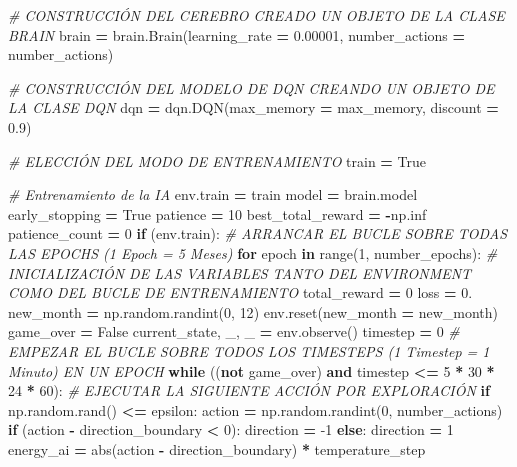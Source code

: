 \documentclass[]{book}
\newenvironment{Shaded}{\begin{snugshade}}{\end{snugshade}}
\newcommand{\BuiltInTok}[1]{#1}
\newcommand{\CommentTok}[1]{\textcolor[rgb]{0.56,0.35,0.01}{\textit{#1}}}
\newcommand{\ControlFlowTok}[1]{\textcolor[rgb]{0.13,0.29,0.53}{\textbf{#1}}}
\newcommand{\DecValTok}[1]{\textcolor[rgb]{0.00,0.00,0.81}{#1}}
\newcommand{\FloatTok}[1]{\textcolor[rgb]{0.00,0.00,0.81}{#1}}
\newcommand{\KeywordTok}[1]{\textcolor[rgb]{0.13,0.29,0.53}{\textbf{#1}}}
\newcommand{\NormalTok}[1]{#1}
\newcommand{\OperatorTok}[1]{\textcolor[rgb]{0.81,0.36,0.00}{\textbf{#1}}}
\newcommand{\VariableTok}[1]{\textcolor[rgb]{0.00,0.00,0.00}{#1}}
\begin{document}
\begin{Shaded}
\begin{Highlighting}[]
\CommentTok{# CONSTRUCCIÓN DEL CEREBRO CREADO UN OBJETO DE LA CLASE BRAIN}
\NormalTok{brain }\OperatorTok{=}\NormalTok{ brain.Brain(learning_rate }\OperatorTok{=} \FloatTok{0.00001}\NormalTok{, number_actions }\OperatorTok{=}\NormalTok{ number_actions)}

\CommentTok{# CONSTRUCCIÓN DEL MODELO DE DQN CREANDO UN OBJETO DE LA CLASE DQN }
\NormalTok{dqn }\OperatorTok{=}\NormalTok{ dqn.DQN(max_memory }\OperatorTok{=}\NormalTok{ max_memory, discount }\OperatorTok{=} \FloatTok{0.9}\NormalTok{)}

\CommentTok{# ELECCIÓN DEL MODO DE ENTRENAMIENTO}
\NormalTok{train }\OperatorTok{=} \VariableTok{True}

\CommentTok{# Entrenamiento de la IA}
\NormalTok{env.train }\OperatorTok{=}\NormalTok{ train}
\NormalTok{model }\OperatorTok{=}\NormalTok{ brain.model}
\NormalTok{early_stopping }\OperatorTok{=} \VariableTok{True}
\NormalTok{patience }\OperatorTok{=} \DecValTok{10}
\NormalTok{best_total_reward }\OperatorTok{=} \OperatorTok{-}\NormalTok{np.inf}
\NormalTok{patience_count }\OperatorTok{=} \DecValTok{0}
\ControlFlowTok{if}\NormalTok{ (env.train):}
    \CommentTok{# ARRANCAR EL BUCLE SOBRE TODAS LAS EPOCHS (1 Epoch = 5 Meses)}
    \ControlFlowTok{for}\NormalTok{ epoch }\KeywordTok{in} \BuiltInTok{range}\NormalTok{(}\DecValTok{1}\NormalTok{, number_epochs):}
        \CommentTok{# INICIALIZACIÓN DE LAS VARIABLES TANTO DEL ENVIRONMENT COMO DEL BUCLE DE ENTRENAMIENTO}
\NormalTok{        total_reward }\OperatorTok{=} \DecValTok{0}
\NormalTok{        loss }\OperatorTok{=} \FloatTok{0.}
\NormalTok{        new_month }\OperatorTok{=}\NormalTok{ np.random.randint(}\DecValTok{0}\NormalTok{, }\DecValTok{12}\NormalTok{)}
\NormalTok{        env.reset(new_month }\OperatorTok{=}\NormalTok{ new_month)}
\NormalTok{        game_over }\OperatorTok{=} \VariableTok{False}
\NormalTok{        current_state, _, _ }\OperatorTok{=}\NormalTok{ env.observe()}
\NormalTok{        timestep }\OperatorTok{=} \DecValTok{0}
        \CommentTok{# EMPEZAR EL BUCLE SOBRE TODOS LOS TIMESTEPS (1 Timestep = 1 Minuto) EN UN EPOCH}
        \ControlFlowTok{while}\NormalTok{ ((}\KeywordTok{not}\NormalTok{ game_over) }\KeywordTok{and}\NormalTok{ timestep }\OperatorTok{<=} \DecValTok{5} \OperatorTok{*} \DecValTok{30} \OperatorTok{*} \DecValTok{24} \OperatorTok{*} \DecValTok{60}\NormalTok{):}
            \CommentTok{# EJECUTAR LA SIGUIENTE ACCIÓN POR EXPLORACIÓN}
            \ControlFlowTok{if}\NormalTok{ np.random.rand() }\OperatorTok{<=}\NormalTok{ epsilon:}
\NormalTok{                action }\OperatorTok{=}\NormalTok{ np.random.randint(}\DecValTok{0}\NormalTok{, number_actions)}
                \ControlFlowTok{if}\NormalTok{ (action }\OperatorTok{-}\NormalTok{ direction_boundary }\OperatorTok{<} \DecValTok{0}\NormalTok{):}
\NormalTok{                    direction }\OperatorTok{=} \DecValTok{-1}
                \ControlFlowTok{else}\NormalTok{:}
\NormalTok{                    direction }\OperatorTok{=} \DecValTok{1}
\NormalTok{                energy_ai }\OperatorTok{=} \BuiltInTok{abs}\NormalTok{(action }\OperatorTok{-}\NormalTok{ direction_boundary) }\OperatorTok{*}\NormalTok{ temperature_step}


\end{Highlighting}
\end{Shaded}
\end{document}
